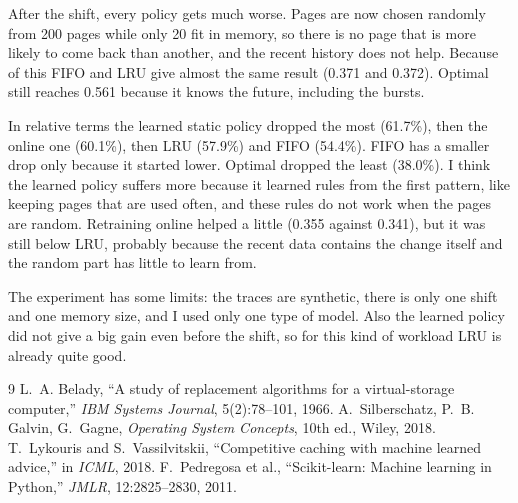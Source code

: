 \documentclass[10pt,a4paper]{article}
\begin{document}
After the shift, every policy gets much worse. Pages are now chosen randomly from 200 pages while only 20 fit in memory, so there is no page that is more likely to come back than another, and the recent history does not help. Because of this FIFO and LRU give almost the same result (0.371 and 0.372). Optimal still reaches 0.561 because it knows the future, including the bursts.

In relative terms the learned static policy dropped the most (61.7\%), then the online one (60.1\%), then LRU (57.9\%) and FIFO (54.4\%). FIFO has a smaller drop only because it started lower. Optimal dropped the least (38.0\%). I think the learned policy suffers more because it learned rules from the first pattern, like keeping pages that are used often, and these rules do not work when the pages are random. Retraining online helped a little (0.355 against 0.341), but it was still below LRU, probably because the recent data contains the change itself and the random part has little to learn from.

The experiment has some limits: the traces are synthetic, there is only one shift and one memory size, and I used only one type of model. Also the learned policy did not give a big gain even before the shift, so for this kind of workload LRU is already quite good.

\begin{thebibliography}{9}
 L.~A. Belady, ``A study of replacement algorithms for a virtual-storage computer,'' \emph{IBM Systems Journal}, 5(2):78--101, 1966.
 A.~Silberschatz, P.~B. Galvin, G.~Gagne, \emph{Operating System Concepts}, 10th ed., Wiley, 2018.
 T.~Lykouris and S.~Vassilvitskii, ``Competitive caching with machine learned advice,'' in \emph{ICML}, 2018.
 F.~Pedregosa et al., ``Scikit-learn: Machine learning in Python,'' \emph{JMLR}, 12:2825--2830, 2011.
\end{thebibliography}
\end{document}
